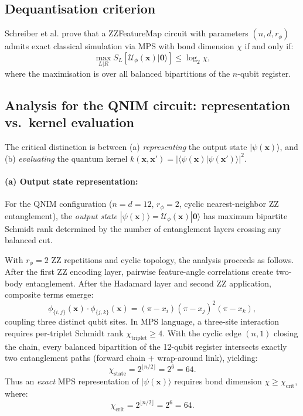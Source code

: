 \documentclass[11pt,a4paper, english]{book}
\theoremstyle{plain}
\theoremstyle{definition}
\numberwithin{equation}{chapter}
\numberwithin{figure}{chapter}
\numberwithin{table}{chapter}
\begin{document}
\subsection{Dequantisation criterion}

Schreiber et al. prove that a ZZFeatureMap circuit with parameters $(n, d, r_\phi)$
admits exact classical simulation via MPS with bond dimension $\chi$ if and only if:
\begin{equation}
  \label{eq:dequant_criterion}
  \max_{L|R} S_L[\mathcal{U}_\phi(\mathbf{x})|\mathbf{0}\rangle] \leq \log_2 \chi,
\end{equation}
where the maximisation is over all balanced bipartitions of the $n$-qubit register.

\subsection{Analysis for the QNIM circuit: representation vs.\ kernel evaluation}

The critical distinction is between (a) \emph{representing} the output state $|\psi(\mathbf{x})\rangle$,
and (b) \emph{evaluating} the quantum kernel $k(\mathbf{x}, \mathbf{x}') = |\langle\psi(\mathbf{x})|\psi(\mathbf{x}')\rangle|^2$.

\paragraph{(a) Output state representation:} For the QNIM configuration ($n = d = 12$, 
$r_\phi = 2$, cyclic nearest-neighbor ZZ entanglement), the \emph{output state}
$|\psi(\mathbf{x})\rangle = \mathcal{U}_\phi(\mathbf{x})|\mathbf{0}\rangle$ has maximum bipartite
Schmidt rank determined by the number of entanglement layers crossing any balanced cut.

With $r_\phi = 2$ ZZ repetitions and cyclic topology, the analysis proceeds as follows.
After the first ZZ encoding layer, pairwise feature-angle correlations create 
two-body entanglement. After the Hadamard layer and second ZZ application, composite terms emerge:
\begin{equation}
  \label{eq:composite_terms}
  \phi_{\{i,j\}}(\mathbf{x}) \cdot \phi_{\{j,k\}}(\mathbf{x})
  = (\pi - x_i)(\pi - x_j)^2(\pi - x_k),
\end{equation}
coupling three distinct qubit sites. In MPS language, a three-site interaction
requires per-triplet Schmidt rank $\chi_\mathrm{triplet} \geq 4$. With the cyclic
edge $(n,1)$ closing the chain, every balanced bipartition of the 12-qubit
register intersects exactly two entanglement paths (forward chain + wrap-around link),
yielding:
\begin{equation}
  \label{eq:chi_state}
  \chi_\mathrm{state} = 2^{\lfloor n/2 \rfloor} = 2^6 = 64.
\end{equation}
Thus an \emph{exact} MPS representation of $|\psi(\mathbf{x})\rangle$ requires bond dimension $\chi \geq \chi_\mathrm{crit}$, where:
\begin{equation}
  \label{eq:chi_crit}
  \chi_\mathrm{crit} = 2^{\lfloor n/2 \rfloor} = 2^6 = 64.
\end{equation}
\end{document}
